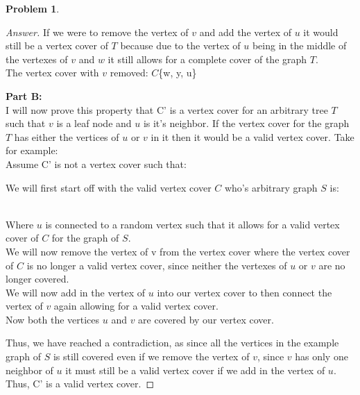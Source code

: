 \documentclass[11pt]{article}
\theoremstyle{definition}
\theoremstyle{definition}
\newtheorem{required}{Problem}
\theoremstyle{definition}
\begin{document}
\begin{required}
\begin{proof}[Answer]
If we were to remove the vertex of $v$ and add the vertex of $u$ it would still be a vertex cover of $T$ because due to the vertex of $u$ being in the middle of the vertexes of $v$ and $w$ it still allows for a complete cover of the graph $T$. \\
The vertex cover with $v$ removed: $C$\{w, y, u\}

\textbf{Part B:}\\
I will now prove this property that C' is a vertex cover for an arbitrary tree $T$ such that $v$ is a leaf node and $u$ is it's neighbor. If the vertex cover for the graph $T$ has either the vertices of $u$ or $v$ in it then it would be a valid vertex cover. Take for example: \\
Assume C' is not a vertex cover such that: \\
\begin{center}
We will first start off with the valid vertex cover $C$ who's arbitrary graph $S$ is: \\

    \\
Where $u$ is connected to a random vertex such that it allows for a valid vertex cover of $C$ for the graph of $S$. \\   

We will now remove the vertex of v from the vertex cover where the vertex cover of $C$ is no longer a valid vertex cover, since neither the vertexes of $u$ or $v$ are no longer covered.\\

We will now add in the vertex of $u$ into our vertex cover to then connect the vertex of $v$ again allowing for a valid vertex cover. \\
Now both the vertices $u$ and $v$ are covered by our vertex cover.\\
\end{center}

Thus, we have reached a contradiction, as since all the vertices in the example graph of $S$ is still covered even if we remove the vertex of $v$, since $v$ has only one neighbor of $u$ it must still be a valid vertex cover if we add in the vertex of $u$. \\
Thus, C' is a valid vertex cover.


\end{proof}


\end{required}

\end{document}
